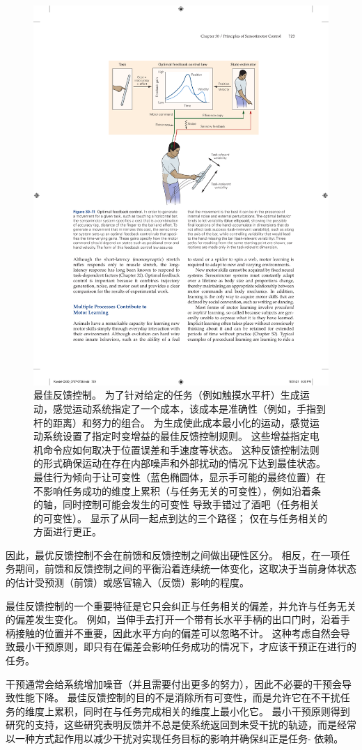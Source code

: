 \begin{figure}[htbp]
	\centering
	\includegraphics[width=0.7\linewidth]{chap30/fig_30_11}
	\caption{最佳反馈控制。 为了针对给定的任务（例如触摸水平杆）生成运动，感觉运动系统指定了一个成本，该成本是准确性（例如，手指到杆的距离）和努力的组合。 为生成使此成本最小化的运动，感觉运动系统设置了指定时变增益的最佳反馈控制规则。 这些增益指定电机命令应如何取决于位置误差和手速度等状态。 这种反馈控制法则的形式确保运动在存在内部噪声和外部扰动的情况下达到最佳状态。 最佳行为倾向于让可变性（蓝色椭圆体，显示手可能的最终位置）在不影响任务成功的维度上累积（与任务无关的可变性），例如沿着条的轴，同时控制可能会发生的可变性 导致手错过了酒吧（任务相关的可变性）。 显示了从同一起点到达的三个路径； 仅在与任务相关的方面进行更正。}
	\label{fig:30_11}
\end{figure}

因此，最优反馈控制不会在前馈和反馈控制之间做出硬性区分。 相反，在一项任务期间，前馈和反馈控制之间的平衡沿着连续统一体变化，这取决于当前身体状态的估计受预测（前馈）或感官输入（反馈）影响的程度。

最佳反馈控制的一个重要特征是它只会纠正与任务相关的偏差，并允许与任务无关的偏差发生变化。 例如，当伸手去打开一个带有长水平手柄的出口门时，沿着手柄接触的位置并不重要，因此水平方向的偏差可以忽略不计。 这种考虑自然会导致最小干预原则，即只有在偏差会影响任务成功的情况下，才应该干预正在进行的任务。

干预通常会给系统增加噪音（并且需要付出更多的努力），因此不必要的干预会导致性能下降。 最佳反馈控制的目的不是消除所有可变性，而是允许它在不干扰任务的维度上累积，同时在与任务完成相关的维度上最小化它。 最小干预原则得到研究的支持，这些研究表明反馈并不总是使系统返回到未受干扰的轨迹，而是经常以一种方式起作用以减少干扰对实现任务目标的影响并确保纠正是任务- 依赖。

